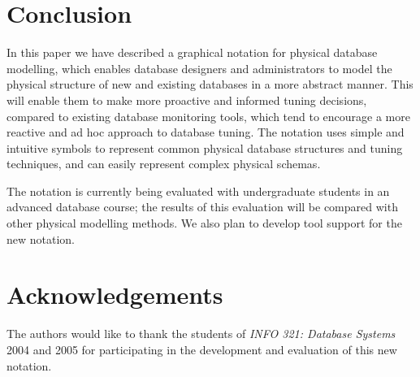 \documentclass{CRPITStyle}
\begin{document}
\section{Conclusion}
\label{sec-conclusion}

In this paper we have described a graphical notation for physical
database modelling, which enables database designers and administrators
to model the physical structure of new and existing databases in a more
abstract manner. This will enable them to make more proactive and
informed tuning decisions, compared to existing database monitoring
tools, which tend to encourage a more reactive and ad hoc approach to
database tuning. The notation uses simple and intuitive symbols to
represent common physical database structures and tuning techniques, and
can easily represent complex physical schemas.

The notation is currently being evaluated with undergraduate students in
an advanced database course; the results of this evaluation will be
compared with other physical modelling methods. We also plan to develop
tool support for the new notation.


\section*{Acknowledgements}

The authors would like to thank the students of \emph{INFO 321: Database
Systems} 2004 and 2005 for participating in the development and evaluation
of this new notation.





\end{document}
